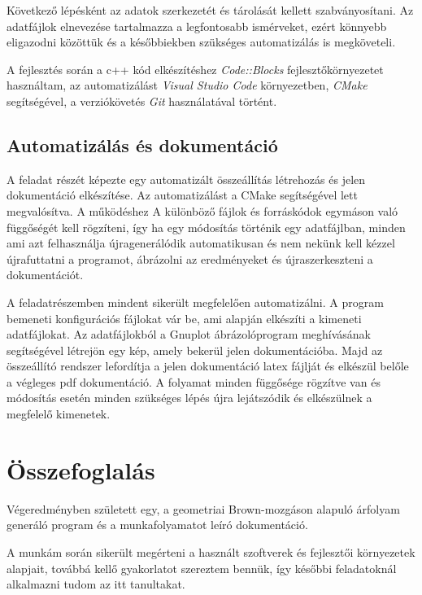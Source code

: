 \documentclass[a4paper, 12pt]{article}
\numberwithin{equation}{section}          %
\numberwithin{figure}{subsection}
\begin{document}
		Következő lépésként az adatok szerkezetét és tárolását kellett szabványosítani.
		Az adatfájlok elnevezése tartalmazza a legfontosabb ismérveket, ezért könnyebb eligazodni
		közöttük és a későbbiek\-ben szükséges automatizálás is megköveteli.

		A fejlesztés során a c++ kód elkészítéshez \textit{Code::Blocks} fejlesztőkörnyezetet használtam,
		az automatizálást \textit{Visual Studio Code} környezetben, \textit{CMake} segítségével,
		a verziókövetés \textit{Git} használatá\-val történt.
		
		\subsection{Automatizálás és dokumentáció}
		
		A feladat részét képezte egy automatizált összeállítás létrehozás és jelen dokumentáció
		elkészítése. Az automatizálást a CMake segítségével lett megvalósítva. A működéshez
		A különböző fájlok és forráskódok egymáson való függőségét kell rögzíteni, így ha
		egy módosítás történik egy adatfájlban, minden ami azt felhasználja újragenerálódik
		automatikusan és nem nekünk kell kézzel újrafuttatni a programot, ábrázolni az 
		eredményeket és újraszerkeszteni a dokumentációt.
		
		A feladatrészemben mindent sikerült megfelelően automatizálni. A program bemeneti
		konfigurációs fájlokat vár be, ami alapján elkészíti a kimeneti adatfájlokat. Az
		adatfájlokból a Gnuplot ábrázolóprogram meghívásának segítségével létrejön egy kép,
		amely bekerül jelen dokumentációba. Majd az összeállító rendszer lefordítja a jelen 
		dokumentáció latex fájlját és elkészül belőle a végleges pdf dokumentáció.
		A folyamat minden függősége rögzítve van és módosítás esetén minden szükséges lépés
		újra lejátszódik és elkészülnek a megfelelő kimenetek.
	
	
	\vspace*{2cm}
	\section{Összefoglalás}
	
		Végeredményben született egy, a geometriai Brown-mozgáson alapuló árfolyam generáló
		program és a munkafolyamatot leíró dokumentáció.
	
		A munkám során sikerült megérteni a használt szoftverek és fejlesztői környezetek
		alapjait, továbbá kellő gyakorlatot szereztem bennük, így későbbi feladatoknál
		alkalmazni tudom az itt tanultakat.
	
\end{document}
